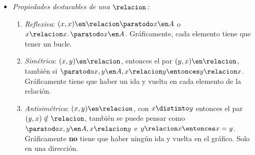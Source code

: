 \begin{itemize}[label={\tiny{}}]
  \item \hypertarget{teoria-1:prop-relaciones}{\textit{Propiedades destacables de una $\relacion$:}}\par
        \begin{enumerate}[label=\tiny\faIcon{poop}]
          \item  \textit{Reflexiva}: $(x, x) \en \relacion \paratodo x \en A$ o $x \relacion x.\, \paratodo x \en A$. Gráficamente,
                cada elemento tiene que tener un bucle.

          \item  \textit{Simétrica}: $(x, y) \en \relacion$, entonces el par $(y, x) \en \relacion$,
                también si $\paratodo x, y \en A, x\relacion y \entonces y \relacion x$.
                Gráficamente tiene que haber un ida y vuelta en cada elemento de la relación.

          \item  \textit{Antisimétrica}: $(x, y) \en \relacion$, con $x \distinto y$ entonces el par $(y, x) \notin \relacion$, también se puede pensar
                como $\paratodo x,y \en A, x\relacion y$ e $ y \relacion x \entonces x = y$.
                Gráficamente \textbf{no} tiene que haber ningún ida y vuelta en el gráfico. Solo en una dirección.


\end{enumerate}
\end{itemize}
